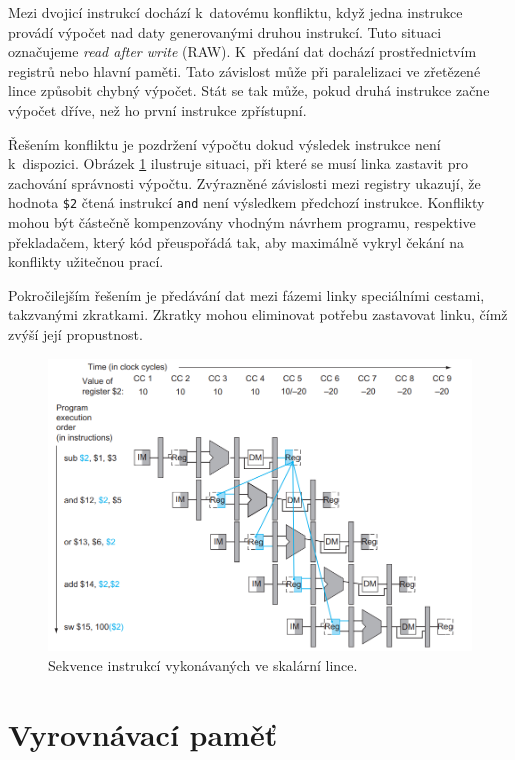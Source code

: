 Mezi dvojicí instrukcí dochází k~datovému konfliktu, když jedna instrukce provádí výpočet nad daty generovanými druhou instrukcí.
Tuto situaci označujeme \emph{read after write} (RAW).
K~předání dat dochází prostřednictvím registrů nebo hlavní paměti.
Tato závislost může při paralelizaci ve zřetězené lince způsobit chybný výpočet.
Stát se tak může, pokud druhá instrukce začne výpočet dříve, než ho první instrukce zpřístupní.

Řešením konfliktu je pozdržení výpočtu dokud výsledek instrukce není k~dispozici.
Obrázek \ref{dataconflictsfrombook} ilustruje situaci, při které se musí linka zastavit pro zachování správnosti výpočtu.
Zvýrazněné závislosti mezi registry ukazují, že hodnota \texttt{\$2} čtená instrukcí \texttt{and} není výsledkem předchozí instrukce.
Konflikty mohou být částečně kompenzovány vhodným návrhem programu, respektive překladačem, který kód přeuspořádá tak, aby maximálně vykryl čekání na konflikty užitečnou prací.

Pokročilejším řešením je předávání dat mezi fázemi linky speciálními cestami, takzvanými zkratkami.
Zkratky mohou eliminovat potřebu zastavovat linku, čímž zvýší její propustnost. \cite{avs}

\begin{figure}[ht]\centering
  \centering
  \includegraphics[width=15cm]{obrazky-figures/conflicts.png}
  \caption{Sekvence instrukcí vykonávaných ve skalární lince. \cite{OrganizationAndDesign}}
  \label{dataconflictsfrombook}
\end{figure}

\section{Vyrovnávací paměť}
\label{cache}

